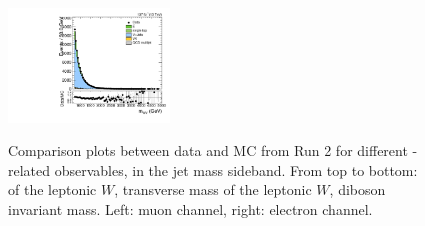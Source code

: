 \begin{figure}[htbp]
  \includegraphics[width=0.3825\textwidth]{fig/analysisAppendix/SB_b1_e_allP_allC_allD_Run2_mWV.pdf}\\
  \caption{
    Comparison plots between data and MC from Run 2 for different \Wlep-related observables, in the jet mass sideband.
    From top to bottom: \pt of the leptonic $W$, transverse mass of the leptonic $W$, diboson invariant mass.
    Left: muon channel, right: electron channel.
  }
  \label{fig:SB_controlPlotsRun2_2}
\end{figure}

